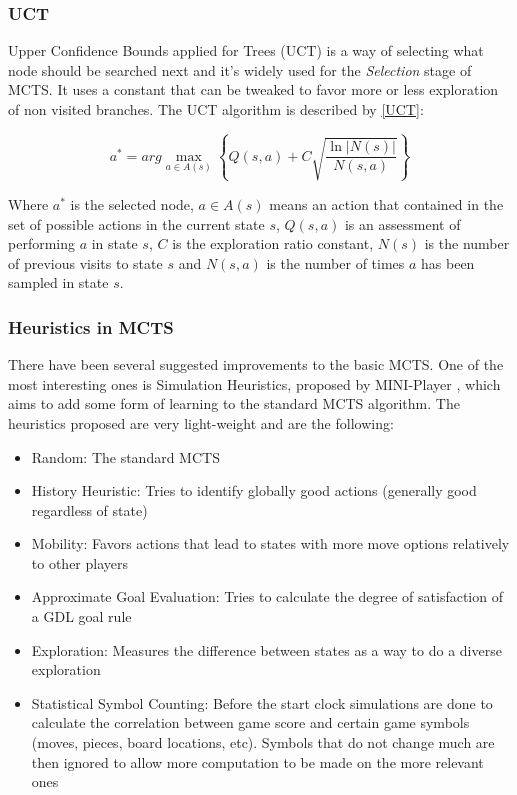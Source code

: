 \subsubsection{UCT}
\label{sssec:UCT}

Upper Confidence Bounds applied for Trees (UCT) is a way of selecting what node should be searched next and it's widely used for the \textit{Selection} stage of \gls{MCTS}. It uses a constant that can be tweaked to favor more or less exploration of non visited branches. The UCT algorithm is described by \ref{UCT}:

\begin{center}
\begin{equation} \label{UCT}
a^{*} = arg \max_{a\in A(s)} \left \{ Q(s,a) + C \sqrt{\frac{\ln|N(s)|} {N(s,a)}} \right \}
\end{equation}
\end{center}

Where $a^{*}$ is the selected node, $a \in A(s)$ means an action that contained in the set of possible actions in the current state $s$, $Q(s,a)$ is an assessment of performing $a$ in state $s$, $C$ is the exploration ratio constant, $N(s)$ is the number of previous visits to state $s$ and $N(s,a)$ is the number of times $a$ has been sampled in state $s$.


\subsubsection{Heuristics in MCTS}
There have been several suggested improvements to the basic MCTS. One of the most interesting ones is Simulation Heuristics, proposed by MINI-Player \cite{Swiechowski2014}, which aims to add some form of learning to the standard MCTS algorithm. The heuristics proposed are very light-weight and are the following:

\begin{itemize}

\item Random: The standard MCTS

\item History Heuristic: Tries to identify globally good actions (generally good regardless of state)

\item Mobility: Favors actions that lead to states with more move options relatively to other players

\item Approximate Goal Evaluation: Tries to calculate the degree of satisfaction of a GDL goal rule

\item Exploration: Measures the difference between states as a way to do a diverse exploration

\item Statistical Symbol Counting: Before the start clock simulations are done to calculate the correlation between game score and certain game symbols (moves, pieces, board locations, etc). Symbols that do not change much are then ignored to allow more computation to be made on the more relevant ones

\end{itemize}

